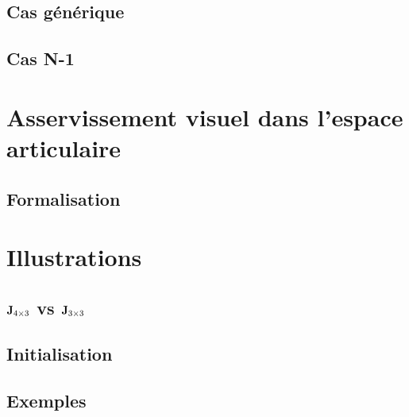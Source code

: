 \subsection{Cas g\'en\'erique}

\subsection{Cas N-1}


\section{Asservissement visuel dans l'espace articulaire}

\subsection{Formalisation}

\section{Illustrations}

\subsection{${\bf J}_{4 \times 3}$ vs ${\bf J}_{3 \times 3}$}

\subsection{Initialisation}

\subsection{Exemples}

